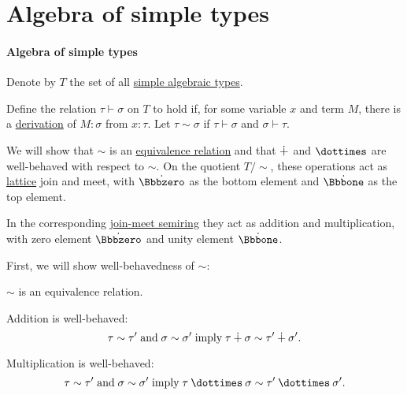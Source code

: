 \section{Algebra of simple types}\label{sec:algebra_of_simple_types}

\paragraph{Algebra of simple types}

\begin{proposition}\label{thm:simple_algebraic_type_arithmetic}
  Denote by \( T \) the set of all \hyperref[def:simple_algebraic_types]{simple algebraic types}. 

  Define the relation \( \tau \vdash \sigma \) on \( T \) to hold if, for some variable \( x \) and term \( M \), there is a \hyperref[def:type_derivation_tree]{derivation} of \( M: \sigma \) from \( x: \tau \). Let \( \tau \sim \sigma \) if \( \tau \vdash \sigma \) and \( \sigma \vdash \tau \).

  We will show that \( {\sim} \) is an \hyperref[def:equivalence_relation]{equivalence relation} and that \( {\mathbin{\dotplus}} \) and \( {\syntimes} \) are well-behaved with respect to \( {\sim} \). On the quotient \( T / {\sim} \), these operations act as \hyperref[def:lattice]{lattice} join and meet, with \( {\syn\Bbbzero} \) as the bottom element and \( {\syn\Bbbone} \) as the top element.

  In the corresponding \hyperref[ex:def:semiring/lattice]{join-meet semiring} they act as addition and multiplication, with zero element \( {\syn\Bbbzero} \) and unity element \( {\syn\Bbbone} \).

  First, we will show well-behavedness of \( {\sim} \):
  \begin{thmenum}[series=thm:simple_algebraic_type_arithmetic]
     \( {\sim} \) is an equivalence relation.

     Addition is well-behaved:
    \begin{equation}\label{eq:thm:simple_algebraic_type_arithmetic/addition_well_behaved}
      \tau \sim \tau' \T{and} \sigma \sim \sigma' \T{imply} \tau \synplus \sigma \sim \tau' \synplus \sigma'.
    \end{equation}

     Multiplication is well-behaved:
    \begin{equation}\label{eq:thm:simple_algebraic_type_arithmetic/multiplication_well_behaved}
      \tau \sim \tau' \T{and} \sigma \sim \sigma' \T{imply} \tau \syntimes \sigma \sim \tau' \syntimes \sigma'.
    \end{equation}
  \end{thmenum}


\end{proposition}
